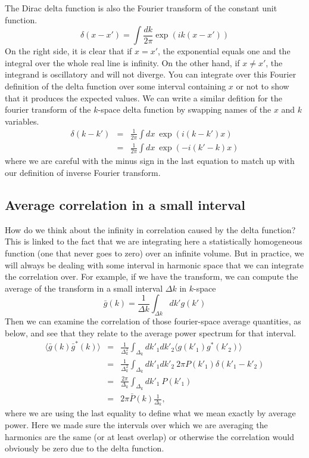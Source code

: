 The Dirac delta function is also the Fourier transform of the constant unit function.
\begin{equation}
   \delta(x-x') = \int \frac{dk}{2\pi} \exp(i k (x-x')) 
\end{equation}
On the right side, it is clear that if $x=x'$, the exponential equals one and the integral over the whole real line is infinity.  On the other hand, if $x \neq x'$, the integrand is oscillatory and will not diverge.  You can integrate over this Fourier definition of the delta function over some interval containing $x$ or not to show that it produces the expected values.  We can write a similar defition for the fourier transform of the $k$-space delta function by swapping names of the $x$ and $k$ variables.
\begin{eqnarray}
  \delta(k - k') &=& \frac{1}{2\pi}  \int {dx}\ \exp(i (k-k')x)    \\
  &=& \frac{1}{2\pi}  \int {dx}\ \exp(-i (k'-k)x) 
\end{eqnarray}
where we are careful with the minus sign in the last equation to match up with our definition of inverse Fourier transform.

\subsection{Average correlation in a small interval}
How do we think about the infinity in correlation caused by the delta function?  This is linked to the fact that we are integrating here a statistically homogeneous function (one that never goes to zero) over an infinite volume.  But in practice, we will always be dealing with some interval in harmonic space that we can integrate the correlation over.  For example, if we have the transform, we can compute the average of the transform in a small interval $\Delta k$ in $k$-space
\begin{equation}
  \bar g(k) = \frac{1}{\Delta k} \int_{\Delta k} dk' g(k')
\end{equation}
Then we can examine the correlation of those fourier-space average quantities, as below, and see that they relate to the average power spectrum for that interval. 
\begin{eqnarray}
  \langle \bar g(k)  \bar g^*(k) \rangle &=& \frac{1}{\Delta_k^2} \int_{\Delta_k} dk'_1 dk'_2 \langle g(k'_1) g^*(k'_2) \rangle \\
  &=& \frac{1}{\Delta_k^2} \int_{\Delta_k} dk'_1 dk'_2 \ 2\pi P(k'_1) \delta(k'_1 - k'_2) \\
  &=& \frac{2\pi}{\Delta_k}  \int_{\Delta_k} dk'_1 \  P(k'_1) \\
  &=& 2\pi  \bar P(k)\frac{1}{\Delta_k},
\end{eqnarray}
where we are using the last equality to define what we mean exactly by average power.  Here we made sure the intervals over which we are averaging the harmonics are the same (or at least overlap) or otherwise the correlation would obviously be zero due to the delta function.


